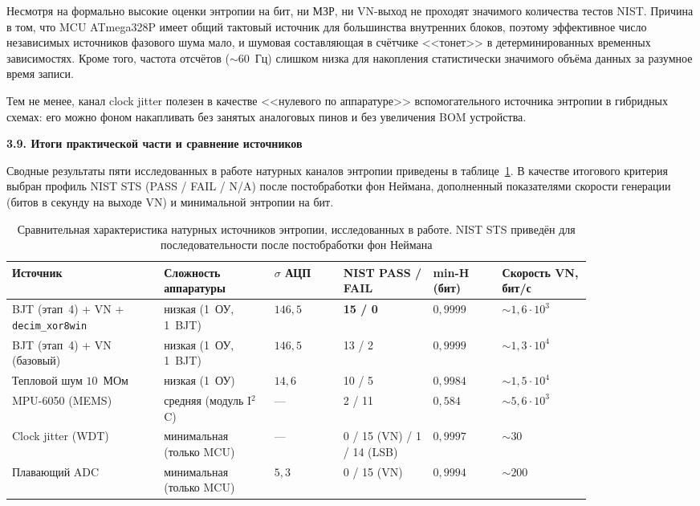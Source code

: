 Несмотря на формально высокие оценки энтропии на бит, ни МЗР, ни VN-выход не
проходят значимого количества тестов NIST. Причина в том, что MCU ATmega328P
имеет общий тактовый источник для большинства внутренних блоков, поэтому
эффективное число независимых источников фазового шума мало, и шумовая
составляющая в счётчике <<тонет>> в детерминированных временных
зависимостях. Кроме того, частота отсчётов ($\sim 60$~Гц) слишком низка для
накопления статистически значимого объёма данных за разумное время записи.

Тем не менее, канал clock jitter полезен в качестве <<нулевого по аппаратуре>>
вспомогательного источника энтропии в гибридных схемах: его можно фоном
накапливать без занятых аналоговых пинов и без увеличения BOM устройства.

\textbf{3.9. Итоги практической части и сравнение источников}

Сводные результаты пяти исследованных в работе натурных каналов энтропии приведены в
таблице~\ref{tab:final_compare}. В качестве итогового критерия выбран профиль NIST
STS (PASS / FAIL / N/A) после постобработки фон Неймана, дополненный показателями
скорости генерации (битов в секунду на выходе VN) и минимальной энтропии на бит.

\begin{table}[htbp]
  \centering
  \footnotesize
  \caption{Сравнительная характеристика натурных источников энтропии,
  исследованных в работе. NIST STS приведён для последовательности после
  постобработки фон Неймана}
  \label{tab:final_compare}
  \begin{tabular}{|p{0.22\linewidth}|p{0.16\linewidth}|p{0.10\linewidth}|p{0.13\linewidth}|p{0.10\linewidth}|p{0.13\linewidth}|}
    \hline
    Источник & Сложность аппаратуры & $\sigma$ АЦП & NIST PASS / FAIL & min-H (бит) & Скорость VN, бит/с \\
    \hline
    BJT (этап~4) + VN + \texttt{decim\_xor8win} & низкая (1~ОУ, 1~BJT) & $146{,}5$ & \textbf{15 / 0} & $0{,}9999$ & ${\sim} 1{,}6\cdot 10^3$ \\
    \hline
    BJT (этап~4) + VN (базовый) & низкая (1~ОУ, 1~BJT) & $146{,}5$ & 13 / 2 & $0{,}9999$ & ${\sim} 1{,}3\cdot 10^4$ \\
    \hline
    Тепловой шум $10$~МОм & низкая (1~ОУ) & $14{,}6$ & 10 / 5 & $0{,}9984$ & ${\sim} 1{,}5\cdot 10^4$ \\
    \hline
    MPU-6050 (MEMS) & средняя (модуль I$^2$C) & --- & 2 / 11 & $0{,}584$ & ${\sim} 5{,}6\cdot 10^3$ \\
    \hline
    Clock jitter (WDT) & минимальная (только MCU) & --- & 0 / 15 (VN) / 1 / 14 (LSB) & $0{,}9997$ & ${\sim} 30$ \\
    \hline
    Плавающий ADC & минимальная (только MCU) & $5{,}3$ & 0 / 15 (VN) & $0{,}9994$ & ${\sim} 200$ \\
    \hline
  \end{tabular}
\end{table}

